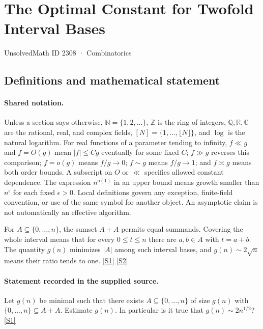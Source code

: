 \documentclass[11pt,a4paper]{article}
\newcommand{\N}{\mathbb{N}}
\newcommand{\Z}{\mathbb{Z}}
\newcommand{\Q}{\mathbb{Q}}
\newcommand{\R}{\mathbb{R}}
\newcommand{\C}{\mathbb{C}}
\newcommand{\sref}[2]{\hyperlink{source:#1:#2}{[S#2]}}
\begin{document}

\setcounter{section}{2307}

\section{The Optimal Constant for Twofold Interval Bases}\label{2308}

{\small\sffamily UnsolvedMath ID 2308 · Combinatorics}

\subsection{Definitions and mathematical statement}

\paragraph{Shared notation.}Unless a section says otherwise, $\N=\{1,2,\ldots\}$,
$\Z$ is the ring of integers, $\Q,\R,\C$ are the rational, real, and complex
fields, $[N]=\{1,\ldots,\lfloor N\rfloor\}$, and $\log$ is the natural
logarithm. For real functions of a parameter tending to infinity,
$f\ll g$ and $f=O(g)$ mean $|f|\leq Cg$ eventually for some fixed $C$;
$f\gg g$ reverses this comparison; $f=o(g)$ means $f/g\to0$;
$f\sim g$ means $f/g\to1$; and $f\asymp g$ means both order bounds.
A subscript on $O$ or $\ll$ specifies allowed constant dependence.
The expression $n^{o(1)}$ in an upper bound means growth smaller than
$n^\epsilon$ for each fixed $\epsilon>0$. Local definitions govern any
exception, finite-field convention, or use of the same symbol for another
object. An asymptotic claim is not automatically an effective algorithm.



For $A\subseteq\{0,\ldots,n\}$, the sumset $A+A$ permits equal summands. Covering the whole interval means that for every $0\leq t\leq n$ there are $a,b\in A$ with $t=a+b$. The quantity $g(n)$ minimizes $|A|$ among such interval bases, and $g(n)\sim2\sqrt n$ means their ratio tends to one. \sref{2308}{1} \sref{2308}{2}

\paragraph{Statement recorded in the supplied source.}
Let $g(n)$ be minimal such that there exists $A\subseteq \{0,\ldots,n\}$ of size $g(n)$ with $\{0,\ldots,n\}\subseteq A+A$. Estimate $g(n)$. In particular is it true that $g(n)\sim 2n^{1/2}$? \sref{2308}{1}
\end{document}
